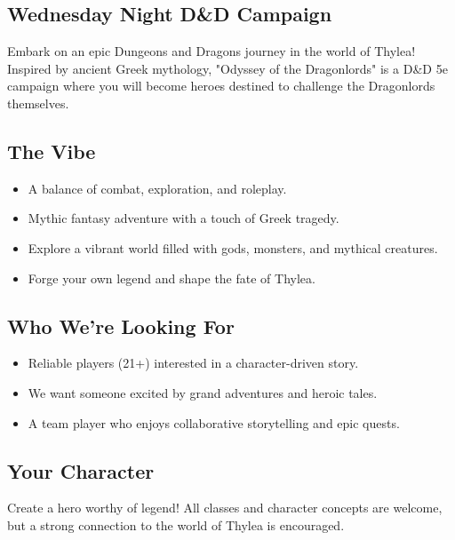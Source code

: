 \documentclass[a4paper, 8pt]{extarticle}
\newcommand{\dnd}{D\&D}
\begin{document}
\color{OODL_Blue}


\vspace{2cm}

\subsection*{\textbf{Wednesday Night \dnd{} Campaign}}
\vspace{-1mm}
Embark on an epic Dungeons and Dragons journey in the world of Thylea! Inspired by ancient Greek mythology, "Odyssey of the Dragonlords" is a D\&D 5e campaign where you will become heroes destined to challenge the Dragonlords themselves.

\vspace{-1mm}
\subsection*{\textbf{The Vibe}}
\begin{itemize}[itemsep=-1mm]
    \item A balance of combat, exploration, and roleplay.
    \item Mythic fantasy adventure with a touch of Greek tragedy.
    \item Explore a vibrant world filled with gods, monsters, and mythical creatures.
    \item Forge your own legend and shape the fate of Thylea.
\end{itemize}

\vspace{-1mm}
\subsection*{\textbf{Who We're Looking For}}
\begin{itemize}[itemsep=-1mm]
    \item Reliable players (21+) interested in a character-driven story.
    \item We want someone excited by grand adventures and heroic tales.
    \item A team player who enjoys collaborative storytelling and epic quests.
\end{itemize}

\vspace{-1mm}
\subsection*{\textbf{Your Character}}
\vspace{-1mm}
Create a hero worthy of legend! All classes and character concepts are welcome, but a strong connection to the world of Thylea is encouraged.
\end{document}
